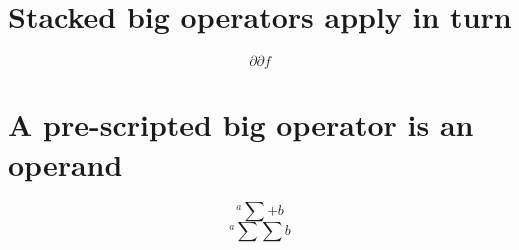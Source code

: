 \documentclass{article}
\begin{document}
\section{Stacked big operators apply in turn}
\[ \partial\partial f \]

\section{A pre-scripted big operator is an operand}
\[ {}^a\sum + b \]
\[ {}^a\sum\sum b \]

\end{document}
